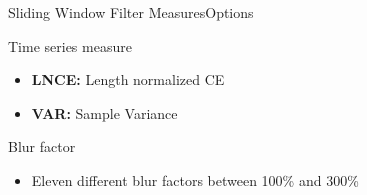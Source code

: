\begin{frame}{Sliding Window Filter Measures}{Options}
    \begin{block}{Time series measure}
        \begin{itemize}
            \item \textbf{LNCE:} Length normalized CE
            
            \item \textbf{VAR:} Sample Variance
            
        \end{itemize}
    \end{block}
    \begin{block}{Blur factor}
        \begin{itemize}
            \item Eleven different blur factors between 100\% and 300\%
        \end{itemize}
    \end{block}
\end{frame}

